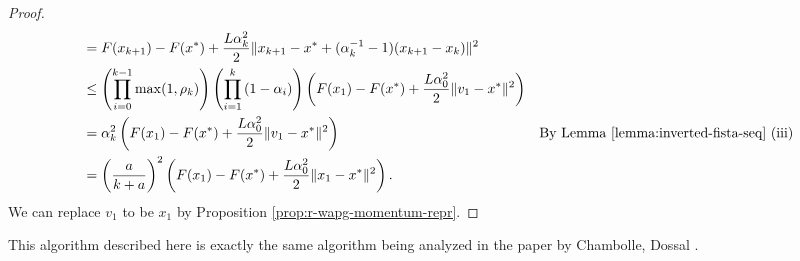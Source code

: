 \documentclass[12pt]{article}
\begin{document}
\begin{proof}
{\begin{align*}
            & = F(x_{k + 1}) - F(x^*) + \frac{L\alpha_k^2}{2}\Vert x_{k + 1} - x^* + (\alpha_k^{-1} - 1)(x_{k + 1} - x_k)\Vert^2
            \\
            & \le 
            \left(
                \prod_{i = 0}^{k - 1} \max(1, \rho_{k})
            \right)
            \left(
                \prod_{i = 1}^{k} \left(1  - \alpha_i\right)
            \right)
            \left(
                F(x_1) - F(x^*) + \frac{L\alpha_0^2}{2}\Vert v_1 - x^*\Vert^2
            \right)
            \\
            &= 
            \alpha_k^2
            \left(
                F(x_1) - F(x^*) + \frac{L\alpha_0^2}{2}\Vert v_1 - x^*\Vert^2
            \right) 
            & \text{By Lemma \ref{lemma:inverted-fista-seq} (iii)}
            \\
            &= 
            \left(\frac{a}{k + a}\right)^2
            \left(
                F(x_1) - F(x^*) + \frac{L\alpha_0^2}{2}\Vert x_1 - x^*\Vert^2
            \right). 
        \end{align*}}
        We can replace $v_1$ to be $x_1$ by Proposition \ref{prop:r-wapg-momentum-repr}. 
    \end{proof}
    \begin{remark}
        This algorithm described here is exactly the same algorithm being analyzed in the paper by Chambolle, Dossal \cite{chambolle_convergence_2015}. 
    \end{remark}
\end{document}
